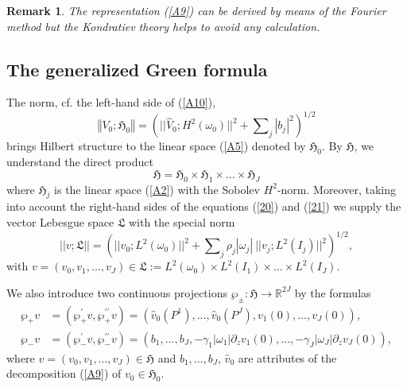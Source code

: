 \documentclass[11pt]{article}%
\newtheorem{remark}[theorem]{Remark}
\numberwithin{equation}{section}
\begin{document}
\begin{remark}
\label{remFOURIER}The representation (\ref{A9}) can be derived by means of the
Fourier method but the Kondratiev theory \cite{Ko} helps to avoid any calculation.
\end{remark}

\subsection{The generalized Green formula\label{sect2.2}}

The norm, cf. the left-hand side of (\ref{A10}),%
\begin{equation}
\left\Vert V_{0};\mathfrak{H}_{0}\right\Vert =(||\widehat{V}_{0};H^{2}%
(\omega_{0})||^{2}+%
{\textstyle\sum\nolimits_{j}}
|b_{j}|^{2})^{1/2} \label{A11}%
\end{equation}
brings Hilbert structure to the linear space (\ref{A5}) denoted by
$\mathfrak{H}_{0}$. By $\mathfrak{H}$, we understand the direct product%
\begin{equation}
\mathfrak{H}=\mathfrak{H}_{0}\times\mathfrak{H}_{1}\times...\times
\mathfrak{H}_{J} \label{A12}%
\end{equation}
where $\mathfrak{H}_{j}$ is the linear space (\ref{A2}) with the Sobolev
$H^{2}$-norm. Moreover, taking into account the right-hand sides of the
equations (\ref{20}) and (\ref{21}) we supply the vector Lebesgue space
$\mathfrak{L}$ with the special norm%
\begin{equation}
||v;\mathfrak{L}||=(||v_{0};L^{2}(\omega_{0})||^{2}+%
{\textstyle\sum\nolimits_{j}}
\rho_{j}|\omega_{j}|\ ||v_{j};L^{2}(I_{j})||^{2})^{1/2}, \label{LL}%
\end{equation}
with $v=(v_{0},v_{1},...,v_{J})\in\mathfrak{L}:=L^{2}(\omega_{0})\times
L^{2}(I_{1})\times...\times L^{2}(I_{J}).$

We also introduce two continuous projections $\wp_{\pm}:\mathfrak{H}%
\rightarrow\mathbb{R}^{2J}$ by the formulas%
\begin{align}
\wp_{+}v  &  =(\wp_{+}^{\prime}v,\wp_{+}^{\prime\prime}v)=(\widehat{v}%
_{0}(P^{1}),...,\widehat{v}_{0}(P^{J}),v_{1}(0),...,v_{J}(0)),\label{A13}\\
\wp_{-}v  &  =(\wp_{-}^{\prime}v,\wp_{-}^{\prime\prime}v)=(b_{1}%
,...,b_{J},-\gamma_{1}|\omega_{1}|\partial_{z}v_{1}(0),...,-\gamma_{J}%
|\omega_{J}|\partial_{z}v_{J}(0)),\nonumber
\end{align}
where $v=(v_{0},v_{1},...,v_{J})\in\mathfrak{H}$ and $b_{1},...,b_{J}$,
$\widehat{v}_{0}$ are attributes of the decomposition (\ref{A9}) of $v_{0}%
\in\mathfrak{H}_{0}$.
\end{document}
